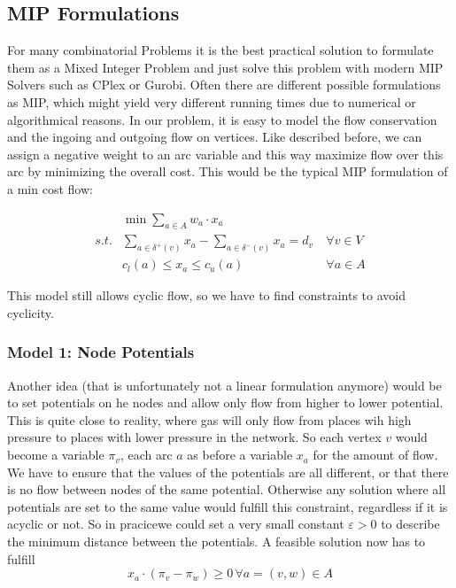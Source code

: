 


\subsection{MIP Formulations}
For many combinatorial Problems it is the best practical solution to formulate them as a Mixed Integer Problem and just 
solve this problem with modern MIP Solvers such as CPlex or Gurobi. Often there are different possible formulations as 
MIP, which might yield very different running times due to numerical or algorithmical reasons. In our problem, it is 
easy to model the flow conservation and the ingoing and outgoing flow on vertices. Like described before, we can assign 
a negative weight to an arc variable and this way maximize flow over this arc by minimizing the overall cost. This 
would be the typical MIP formulation of a min cost flow:

\begin{align*}
  &\min \sum_{a\in A} w_a\cdot x_a  \\
 s.t. & \sum_{a\in \delta^+(v)}x_a - \sum_{a\in\delta^- (v)}x_a = d_v\ &\forall v\in V \\
  & c_l(a)\le x_a \le c_u(a) & \forall a\in A
\end{align*}

This model still allows cyclic flow, so we have to find constraints to avoid cyclicity. 
\subsubsection{Model 1: Node Potentials}

Another idea (that is unfortunately not a linear formulation anymore) would be to set potentials on he nodes and allow 
only flow from higher to lower potential. This is quite close to reality, where gas will only flow from places wih high 
pressure to places with lower pressure in the network. So each vertex $v$ would become a variable $\pi_v$, each arc $a$ 
as before a variable $x_a$ for the amount of flow. We have to ensure that the values of the potentials are all 
different, or that there is no flow between nodes of the same potential. Otherwise any solution where all potentials 
are set to the same value would fulfill this constraint, regardless if it is acyclic or not. So in pracicewe could set 
a very small constant $\varepsilon > 0$ to describe the minimum distance between the potentials. A feasible solution 
now has to fulfill $$x_a\cdot (\pi_v -\pi_w)\ge 0\,\forall a=(v,w)\in A$$

